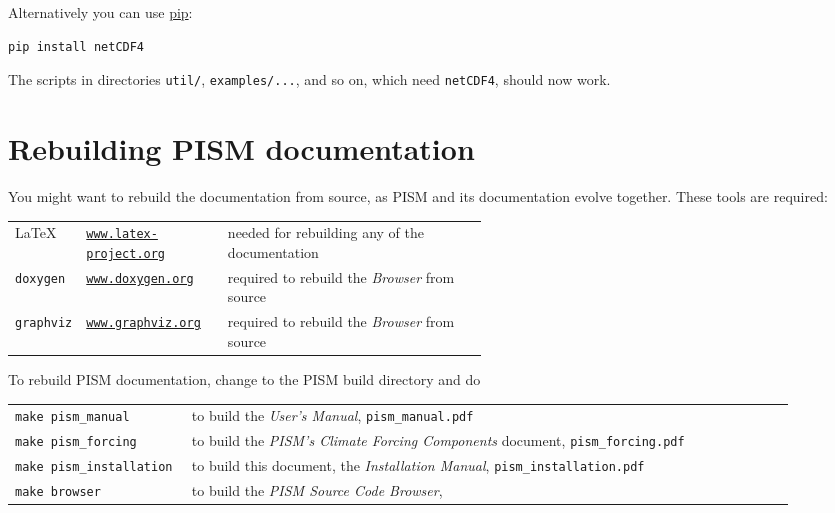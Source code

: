 \documentclass[titlepage,letterpaper,final]{scrartcl}
\begin{document}
Alternatively you can use \href{https://pip.pypa.io/en/stable/}{pip}:
\begin{verbatim}
pip install netCDF4
\end{verbatim}

The scripts in directories \texttt{util/}, \texttt{examples/...}, and so on,
which need \texttt{netCDF4}, should now work.

\section{Rebuilding PISM documentation}
\label{sec:docs}

You might want to rebuild the documentation from source, as PISM and its
documentation evolve together. These tools are required: \bigskip
\begin{center}
  \begin{tabular*}{0.9\linewidth}{llp{0.55\linewidth}}
    \toprule
    \LaTeX & \href{http://www.latex-project.org/}{\texttt{www.latex-project.org}} &  needed for rebuilding any of the documentation \\
    \texttt{doxygen}\index{doxygen} & \href{http://www.stack.nl/~dimitri/doxygen/}{\texttt{www.doxygen.org}} &  required to rebuild the \emph{Browser} from source  \\
    \texttt{graphviz}\index{graphviz} & \href{http://www.graphviz.org/}{\texttt{www.graphviz.org}} & required to rebuild the \emph{Browser} from source  \\
    \bottomrule
  \end{tabular*}
\end{center}
\bigskip
\noindent To rebuild PISM documentation, change to the PISM build directory and do
\begin{center}
  \begin{tabular}{p{0.22\linewidth}p{0.75\linewidth}}
    \texttt{make pism_manual} & to build the \emph{User's Manual}, \texttt{pism_manual.pdf}\\
    \texttt{make pism_forcing} & to build the \emph{PISM's Climate Forcing
      Components} document, \texttt{pism_forcing.pdf} \\
    \texttt{make pism_installation} & to build this document, the \emph{Installation Manual}, \texttt{pism_installation.pdf}\\
    \texttt{make browser} & to build the \emph{PISM Source Code Browser},\\
  \end{tabular}
\end{center}
\bigskip
\end{document}

